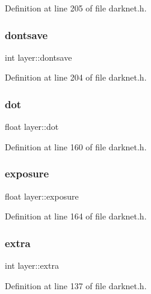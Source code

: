 Definition at line 205 of file darknet.\+h.

\mbox{\label{structlayer_acc28d07d2164bd944a3a3857b482629d}} 
\subsubsection{\texorpdfstring{dontsave}{dontsave}}
{\footnotesize\ttfamily int layer\+::dontsave}



Definition at line 204 of file darknet.\+h.

\mbox{\label{structlayer_aaf67b912e38bb35777c7dd1867217a06}} 
\subsubsection{\texorpdfstring{dot}{dot}}
{\footnotesize\ttfamily float layer\+::dot}



Definition at line 160 of file darknet.\+h.

\mbox{\label{structlayer_a3c8781cb592ce45d1a6e331e558310f7}} 
\subsubsection{\texorpdfstring{exposure}{exposure}}
{\footnotesize\ttfamily float layer\+::exposure}



Definition at line 164 of file darknet.\+h.

\mbox{\label{structlayer_aaaa32102948bc9d4d4a506cf258b9910}} 
\subsubsection{\texorpdfstring{extra}{extra}}
{\footnotesize\ttfamily int layer\+::extra}



Definition at line 137 of file darknet.\+h.

\mbox{\label{structlayer_a2f326ac879fefe2ab4ef8a4b48664b01}} 
